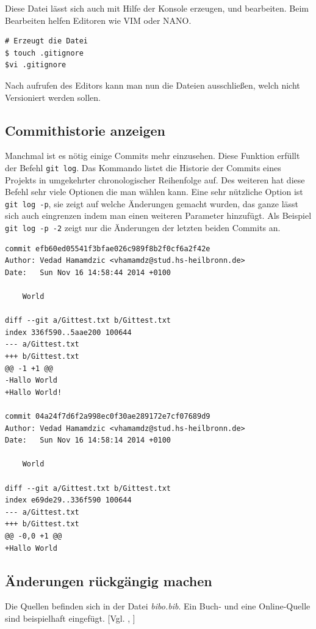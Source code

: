 \documentclass[12pt,a4paper,bibliography=totocnumbered,listof=totocnumbered]{scrartcl}
\begin{document}
Diese Datei lässt sich auch mit Hilfe der Konsole erzeugen, und bearbeiten. Beim Bearbeiten helfen Editoren wie VIM oder NANO. 
\vspace{1em}
\begin{lstlisting}[caption=Git Erstellen der.gitignore Datei, label=lst:arduino]
# Erzeugt die Datei 
$ touch .gitignore
$vi .gitignore
\end{lstlisting}

Nach aufrufen des Editors kann man nun die Dateien ausschließen, welch nicht Versioniert werden sollen.
 

\subsection{Commithistorie anzeigen}
Manchmal ist es nötig einige Commits mehr einzusehen. Diese Funktion erfüllt der Befehl  \lstinline|git log|. Das Kommando listet die Historie der Commits eines Projekts in umgekehrter chronologischer Reihenfolge auf. Des weiteren hat diese Befehl sehr viele Optionen die man wählen kann. Eine sehr nützliche Option ist \lstinline|git log -p|, sie zeigt auf welche Änderungen gemacht wurden, das ganze lässt sich auch eingrenzen indem man einen weiteren Parameter hinzufügt. Als Beispiel \lstinline|git log -p -2| zeigt nur die Änderungen der letzten beiden Commits an.

\vspace{1em}
\begin{lstlisting}[caption=Git log Unterschiede der letzten 2 Commits, label=lst:arduino]
commit efb60ed05541f3bfae026c989f8b2f0cf6a2f42e
Author: Vedad Hamamdzic <vhamamdz@stud.hs-heilbronn.de>
Date:   Sun Nov 16 14:58:44 2014 +0100

    World

diff --git a/Gittest.txt b/Gittest.txt
index 336f590..5aae200 100644
--- a/Gittest.txt
+++ b/Gittest.txt
@@ -1 +1 @@
-Hallo World
+Hallo World!

commit 04a24f7d6f2a998ec0f30ae289172e7cf07689d9
Author: Vedad Hamamdzic <vhamamdz@stud.hs-heilbronn.de>
Date:   Sun Nov 16 14:58:14 2014 +0100

    World

diff --git a/Gittest.txt b/Gittest.txt
index e69de29..336f590 100644
--- a/Gittest.txt
+++ b/Gittest.txt
@@ -0,0 +1 @@
+Hallo World
\end{lstlisting}

  

\subsection{ Änderungen rückgängig machen}
Die Quellen befinden sich in der Datei \textit{bibo.bib}. Ein Buch- und eine Online-Quelle sind beispielhaft eingefügt. [Vgl. \cite{buch}, \cite{online}]
\end{document}
